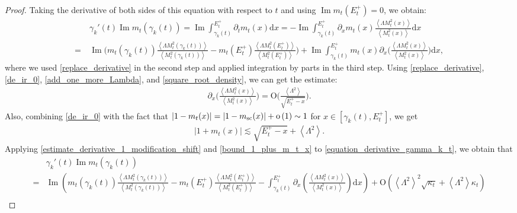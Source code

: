 \documentclass[10pt,reqno]{amsart}
\numberwithin{equation}{section}
\numberwithin{figure}{section}
\theoremstyle{plain} %
\theoremstyle{definition} %
\renewcommand{\txt}[1]{\text{\rm{#1}}}
\newcommand{\p}[1]{({#1})}
\newcommand{\pa}[1]{\left({#1}\right)}
\newcommand{\absa}[1]{\left\lvert #1 \right\rvert}
\newcommand{\avga}[1]{\left\langle #1 \right\rangle}
\DeclareMathOperator{\im}{\mathrm{Im}}
\newcommand{\rd}{\mathrm{d}}
\newcommand{\oo}{\mathrm{o}}
\newcommand{\OO}{\mathrm{O}}
\numberwithin{equation}{section}
\begin{document}
\begin{proof}
    Taking the derivative of both sides of this equation with respect to $t$ and using $\im m_t\p{E_t^+}=0$, we obtain:   %
        \begin{align}
            &~\gamma_k'\pa{t}\im m_t\p{\gamma_k\p{t}}=\im \int_{\gamma_k\p{t}}^{E_t^+}\partial_t m_t\pa{x}\rd x=-\im \int_{\gamma_k\p{t}}^{E_t^+}\partial_x m_t\p{x}\frac{\avga{\Lambda M_t^2\p{x}}}{\avga{ M_t^2\p
            x}}\rd x\label{equation_derivative_gamma_k_t}\\
            =&~\im \bigg(m_t\p{\gamma_k\pa{t}}\frac{\avga{\Lambda M_t^2\p{\gamma_k\p{t}}}}{\avga{ M_t^2\p{
            \gamma_k\p{t}}}}-m_t\p{E_t^+}\frac{\avga{\Lambda M_t^2\p{E_t^+} } }{\avga{M_t^2\p{E_t^+}}} \bigg)+ \im \int_{\gamma_k\p{t}}^{E_t^+} m_t\p{x}\partial_x\bigg(\frac{\avga{\Lambda M_t^2\p{x}}}{\avga{ M_t^2\p{x}}}\bigg)\rd x\nonumber,
        \end{align}
    where we used \eqref{replace_derivative} in the second step and applied integration by parts in the third step.  
    Using \eqref{replace_derivative}, \eqref{de_ir_0}, \eqref{add_one_more_Lambda}, and \eqref{square_root_density}, we can get the estimate:    \begin{equation}\label{estimate_derivative_1_modification_shift}
        \begin{aligned}
            \partial_x\bigg({\frac{\avga{\Lambda M_t^2\pa{x}}}{\avga{ M_t^2\pa{x}}}}\bigg)=\OO\bigg(\frac{\avga{\Lambda^2}}{\sqrt{E_t^+-x}}\bigg).
        \end{aligned}
    \end{equation}
    Also, combining \eqref{de_ir_0} with the fact that $\absa{1-m_t\p{x}}=\absa{1-m_{\txt{sc}} (x) }+\oo\pa{1}\sim 1$ for $x\in[\gamma_k\p{t},E_t^+]$, we get 
    \begin{equation}\label{bound_1_plus_m_t_x}
        \begin{aligned}
            \absa{1+m_t\p{x}}\lesssim \sqrt{E_t^+-x}+\avga{\Lambda^2}.
        \end{aligned}
    \end{equation}
    Applying  \eqref{estimate_derivative_1_modification_shift} and \eqref{bound_1_plus_m_t_x} to \eqref{equation_derivative_gamma_k_t}, we obtain that
        \begin{align}
            &\gamma_k'\p{t}\im m_t\p{\gamma_k\p{t}}\nonumber\\
            =&\im \pa{m_t\p{\gamma_k\p{t}}\frac{\avga{\Lambda M_t^2\p{\gamma_k\p{t}}}}{\avga{ M_t^2\p{\gamma_k\p{t}}}}-m_t\p{E_t^+}\frac{\avga{\Lambda M_t^2\p{E_t^+} } }{\avga{M_t^2\p{E_t^+}}} -  \int_{\gamma_k\p{t}}^{E_t^+}\partial_x\pa{\frac{\avga{\Lambda M_t^2\p{x}}}{\avga{ M_t^2\p{x}}}}\rd x} +\OO\pa{\avga{\Lambda^2}^2\sqrt{\kappa_t}+\avga{\Lambda^2}\kappa_t}\nonumber\\

\end{align}
\end{proof}
\end{document}
